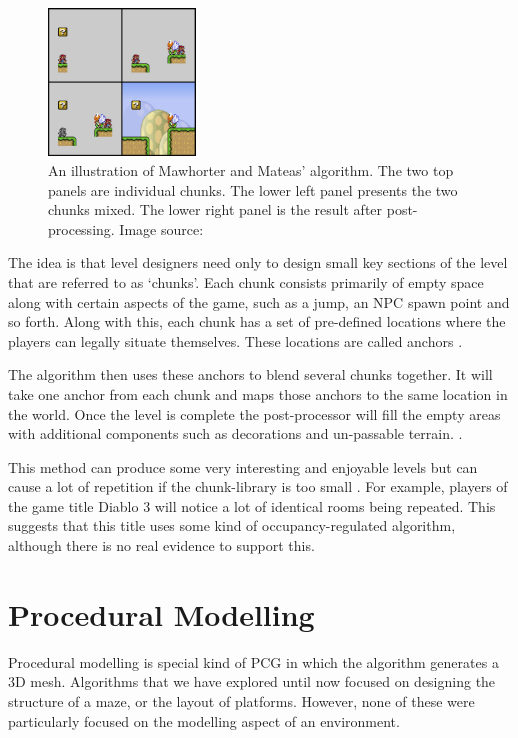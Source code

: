 \begin{figure}[h!]
  \centering
    \includegraphics[width=0.35\textwidth]{images/mario.png}
  \caption{An illustration of Mawhorter and Mateas' algorithm. The two top panels are individual chunks. The lower left panel presents the two chunks mixed. The lower right panel is the result after post-processing. Image source: \citep{DBLP:conf/cig/MawhorterM10}}
\end{figure}


The idea is that level designers need only to design small key sections of the level that are referred to as `chunks'. Each chunk consists primarily of empty space along with certain aspects of the game, such as a jump, an NPC spawn point and so forth. Along with this, each chunk has a set of pre-defined locations where the players can legally situate themselves. These locations are called anchors \citep{DBLP:conf/cig/MawhorterM10}.

The algorithm then uses these anchors to blend several chunks together. It will take one anchor from each chunk and maps those anchors to the same location in the world. Once the level is complete the post-processor will fill the empty areas with additional components such as decorations and un-passable terrain. \citep{DBLP:conf/cig/MawhorterM10}.

This method can produce some very interesting and enjoyable levels but can cause a lot of repetition if the chunk-library is too small \citep{DBLP:conf/cig/MawhorterM10}. For example, players of the game title Diablo 3 will notice a lot of identical rooms being repeated. This suggests that this title uses some kind of occupancy-regulated algorithm, although there is no real evidence to support this.


\section{Procedural Modelling}
Procedural modelling is special kind of PCG in which the algorithm generates a 3D mesh. Algorithms that we have explored until now focused on designing the structure of a maze, or the layout of platforms. However, none of these were particularly focused on the modelling aspect of an environment.

